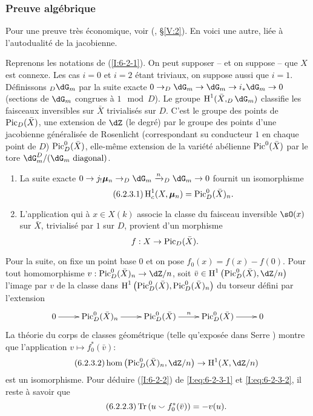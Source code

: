 \subsubsection{Preuve algébrique}\label{I:6-2-3}

Pour une preuve très économique, voir (, \S\ref{V:2}). 
En voici une autre, liée à l'autodualité de la jacobienne. 

Reprenons les notations de (\ref{I:6-2-1}). On peut supposer -- et on suppose -- 
que $X$ est connexe. Les cas $i=0$ et $i=2$ étant triviaux, on suppose aussi 
que $i=1$. Définissons $_D\dG_m$ par la suite exacte 
$0\to _D\dG_m \to \dG_m \to i_*\dG_m\to 0$ (sections de $\dG_m$ congrues à 
$1\mod D$). Le groupe $\h^1(\bar X, _D\dG_m)$ classifie les faisceaux 
inversibles sur $\bar X$ trivialisés sur $D$. C'est le groupe des points de 
$\operatorname{Pic}_D(\bar X)$, une extension de $\dZ$ (le degré) par le groupe des points 
d'une jacobienne généralisée de Rosenlicht (correspondant su conducteur 
$1$ en chaque point de $D$) $\operatorname{Pic}_D^0(\bar X)$, elle-même extension de la 
variété abélienne $\operatorname{Pic}^0(\bar X)$ par le tore 
$\dG_m^D/(\text{$\dG_m$ diagonal})$. 

\begin{enumerate}[\indent a)]
  \item La suite exacte 
    $0\to j_!\dmu_n \to _D\dG_m \xrightarrow{n} _D\dG_m\to 0$ fournit un 
    isomorphisme 
    \begin{equation*}\tag{6.2.3.1}\label{I:eq:6-2-3-1}
      \operatorname{H}_c^1(X,{\bm\mu}_n) = \operatorname{Pic}_D^0(\bar X)_n \text{.}
    \end{equation*}
  \item L'application qui à $x\in X(k)$ associe la classe du faisceau 
    inversible $\sO(x)$ sur $\bar X$, trivialisé par $1$ sur $D$, provient 
    d'un morphisme 
    \[
      f:X \to \operatorname{Pic}_D(\bar X) \text{.}
    \]
\end{enumerate}
Pour la suite, on fixe un point base $0$ et on pose $f_0(x)=f(x)-f(0)$. Pour 
tout homomorphisme $v:\pic_D^0(\bar X)_n \to \dZ/n$, soit 
$\bar v\in \h^1\left(\pic_D^0(\bar X),\dZ/n\right)$ l'image par $v$ de la classe 
dans $\operatorname{H}^1\left(\operatorname{Pic}_D^0(\bar X),\operatorname{Pic}_D^0(\bar X)_n\right)$ du torseur défini 
par l'extension 
\[\xymatrix{
  0 \ar[r] 
    & \pic_D^0(\bar X)_n \ar[r] 
    & \pic_D^0(\bar X) \ar[r]^-n 
    & \pic_D^0(\bar X) \ar[r] 
    & 0
}\]
La théorie du corps de classes géométrique (telle qu'exposée dans 
Serre \cite{se59}) montre que l'application $v\mapsto f_0^*(\bar v)$: 
\begin{equation*}\tag{6.2.3.2}\label{I:eq:6-2-3-2}
  \hom\left(\pic_D^0(\bar X)_n,\dZ/n\right) \to \h^1(X,\dZ/n)
\end{equation*}
est un isomorphisme. Pour déduire (\ref{I:6-2-2}) de \eqref{I:eq:6-2-3-1} et 
\eqref{I:eq:6-2-3-2}, il reste à savoir que 
\begin{equation*}\tag{6.2.2.3}\label{I:eq:6-2-3-3}
  \operatorname{Tr}\left(u \smallsmile f_0^*(\bar v)\right) = -v(u) \text{.}
\end{equation*}

